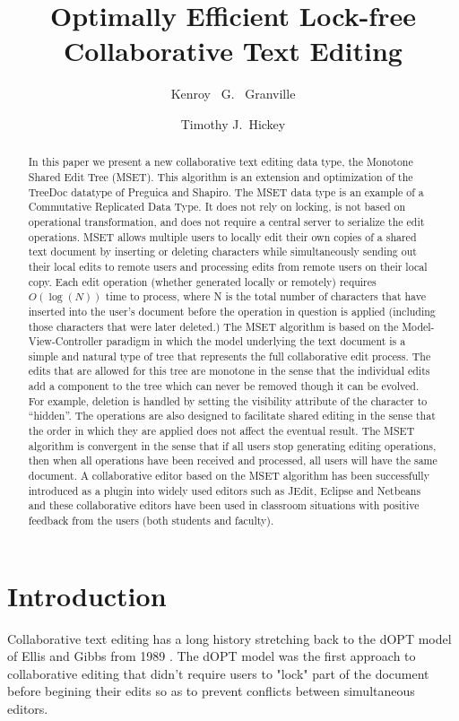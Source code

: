 \documentclass{amsart}
\title{Optimally Efficient Lock-free Collaborative Text Editing}
\author{
Kenroy~ G.~ Granville
\and 
Timothy J.~Hickey 
}
\begin{document}
\maketitle

\begin{abstract}
In this paper we present a new collaborative text editing data type,  
the Monotone Shared Edit Tree (MSET). This algorithm is an extension
and optimization of the TreeDoc datatype of Preguica and Shapiro.  The MSET data type is an example of
a Commutative Replicated Data Type. It does not rely on locking, is not based on operational transformation, 
and does not require a central server to serialize the
edit operations.
MSET allows multiple users to locally 
edit their own copies  of a shared text document
by inserting or deleting characters
while simultaneously sending out their local edits 
to remote users and processing edits from remote users 
on their local copy.
Each edit operation (whether generated locally or remotely) 
requires $O(\log(N))$ time to process, where
N is the total number of characters that have inserted 
into the user's document before the operation in
question is applied (including those characters that were later deleted.)
The MSET algorithm is based on 
the Model-View-Controller paradigm in which the
model underlying the text document is a simple and 
natural type of tree that represents the full collaborative edit process.
The edits that are allowed for this tree are monotone in the sense that
the individual edits add a component to the tree which can never be removed
though it can be evolved. For example, deletion is handled by setting the
visibility attribute of the character to ``hidden''. The operations are also
designed to facilitate shared editing in the sense that the order in which
they are applied does not affect the eventual result.
The MSET algorithm is convergent in the sense that 
if all users stop generating
editing operations, then when all operations have 
been received and processed, all users will have
the same document. 
A collaborative editor based on the MSET algorithm 
has been successfully introduced as a plugin into widely used
editors such as JEdit, Eclipse and Netbeans and 
these collaborative editors have been used in classroom situations
with positive feedback from the users (both students and faculty).
\end{abstract}
\newpage
\tableofcontents
\newpage

\section{Introduction}
\label{intro}
Collaborative text editing has a long history stretching back to the dOPT model of Ellis and Gibbs from 1989 \cite{ellis_concurrency_1989}. The dOPT model was the first approach to collaborative editing that didn't require users to "lock" part of the document before begining their edits so as to prevent conflicts between simultaneous editors.
\end{document}
